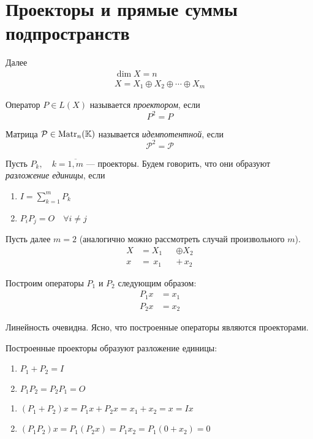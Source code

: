 \section{Проекторы и прямые суммы подпространств}
Далее 
\[
    \begin{gathered}
        \dim X = n \\
        X = X_1 \oplus X_2 \oplus \dotsb \oplus X_m
    \end{gathered}
\]

\begin{definition}
    Оператор $P \in L(X)$ называется \emph{проектором}, если
    \[ P^2 = P \]

    Матрица $\mathcal{P} \in \mathrm{Matr}_{n}({\mathbb{K}})$ называется \emph{идемпотентной}, если
    \[ \mathcal{P}^2 = \mathcal{P} \]
\end{definition}

\begin{definition}
    Пусть $ P_k, \quad k = \overline{1,m} $ — проекторы. Будем говорить, 
    что они образуют \emph{разложение единицы}, если
    \begin{enumerate}
        \item $I = \sum\limits_{k=1}^{m} P_k$
        \item $P_i P_j = O \quad \forall i \neq j$
    \end{enumerate}
\end{definition}

Пусть далее $m=2$ (аналогично можно рассмотреть случай произвольного $m$).
\[
    \begin{alignedat}{2}
        X &= X_1 &&\oplus X_2 \\
        x &= \,x_1 &&+ \,x_2
    \end{alignedat}
\]

Построим операторы $P_1$ и $P_2$ следующим образом:
\begin{align*}
    P_1 x &= x_1 \\
    P_2 x &= x_2 
\end{align*}

Линейность очевидна. Ясно, что построенные операторы являются проекторами.

\begin{lemma} \label{lemma:proj1}
    Построенные проекторы образуют разложение единицы:
    \begin{enumerate}
        \item $P_1 + P_2 = I$
        \item $P_1 P_2 = P_2 P_1 = O$
    \end{enumerate}
\end{lemma}
\begin{proofbreak}
    \begin{enumerate}
        \item $(P_1 + P_2) x = P_1 x + P_2 x = x_1 + x_2 = x = Ix$
        \item $(P_1 P_2) x = P_1 (P_2 x) = P_1 x_2 = P_1 (0 + x_2) = 0$
    \end{enumerate}
\end{proofbreak}

